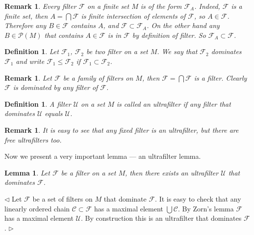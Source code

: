 \documentclass[12pt]{article}
\newtheorem{lemma}[theorem]{Lemma}
\newtheorem{remark}[theorem]{Remark}
\newtheorem{definition}[theorem]{Definition}
\newenvironment{proof}{\par $\triangleleft$}{$\triangleright$}
\begin{document}
\begin{remark}\label{RemDescOfFiltersOnFiniteSets} Every filter $\mathcal{F}$ on
    a finite set $M$ is of the form $\mathcal{F}_{A}$. Indeed, $\mathcal{F}$ is
    a finite set, then $A=\bigcap\mathcal{F}$ is finite intersection of elements
    of $\mathcal{F}$, so $A\in\mathcal{F}$. Therefore any $B\in\mathcal{F}$
    contains $A$, and $\mathcal{F}\subset\mathcal{F}_A$. On the other hand any
    $B\in\mathcal{P}(M)$ that contains $A\in\mathcal{F}$ is in $\mathcal{F}$ by
    definition of filter. So $\mathcal{F}_A\subset\mathcal{F}$.
\end{remark}


\begin{definition}\label{DefFilterComparsion} Let $\mathcal{F}_1$,
    $\mathcal{F}_2$ be two filter on a set $M$. We say that $\mathcal{F}_2$
    dominates $\mathcal{F}_1$ and write $\mathcal{F}_1\leq \mathcal{F}_2$ if
    $\mathcal{F}_1\subset\mathcal{F}_2$.
\end{definition}

\begin{remark} Let $\mathscr{F}$ be a family of filters on $M$, then
    $\mathcal{F}=\bigcap \mathscr{F}$ is a filter. Clearly $\mathcal{F}$ is
    dominated by any filter of $\mathscr{F}$.
\end{remark}

\begin{definition}\label{DefUltraFilter} A filter $\mathcal{U}$ on a set $M$ is
    called an ultrafilter if any filter that dominates $\mathcal{U}$ equals
    $\mathcal{U}$.
\end{definition}

\begin{remark}\label{RemFixedFilterIsAnUltraFilter} It is easy to see that any
    fixed filter is an ultrafilter, but there are free ultrafilters too.
\end{remark}

Now we present a very important lemma --- an ultrafilter lemma.

\begin{lemma}\label{LemExistenceOfUltraFilters} Let $\mathcal{F}$ be a filter on
    a set $M$, then there exists an ultrafilter $\mathcal{U}$ that dominates
    $\mathcal{F}$.
\end{lemma}
\begin{proof} Let $\mathscr{F}$ be a set of filters on $M$ that dominate
    $\mathcal{F}$. It is easy to check that any linearly ordered chain
    $\mathscr{C}\subset \mathscr{F}$ has a maximal element $\bigcup\mathscr{C}$.
    By Zorn's lemma $\mathscr{F}$ has a maximal element $\mathcal{U}$. By
    construction this is an ultrafilter that dominates $\mathcal{F}$.
\end{proof}
\end{document}
